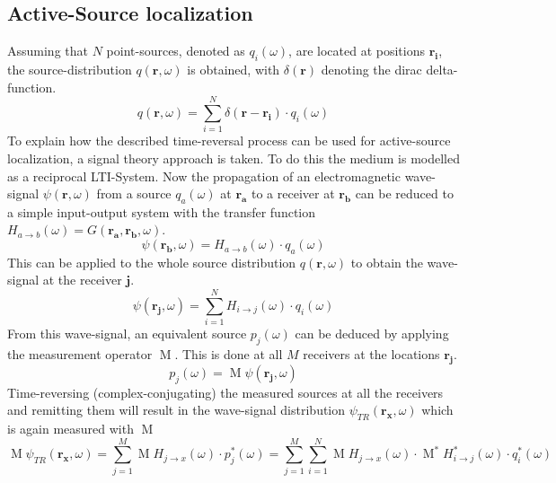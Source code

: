 \subsection{Active-Source localization}
Assuming that \(N\) point-sources, denoted as \(q_i(\omega)\), are located at positions \(\mathbf{r_i}\), the source-distribution \(q(\mathbf{r}, \omega)\) is obtained, with \(\delta(\mathbf{r}) \) denoting the dirac delta-function.
\begin{equation}
    q(\mathbf{r}, \omega) = \sum_{i=1}^{N} \delta(\mathbf{r} - \mathbf{r_i}) \cdot q_i(\omega)
\end{equation}
To explain how the described time-reversal process can be used for active-source localization, a signal theory approach is taken.
To do this the medium is modelled as a reciprocal LTI-System.
Now the propagation of an electromagnetic wave-signal \(\psi(\mathbf{r}, \omega )\) from a source \(q_a(\omega )\) at \(\mathbf{r_a}\) to a receiver at \(\mathbf{r_b}\) can be reduced to a simple input-output system with the transfer function \(H_{a\rightarrow b}(\omega) = G(\mathbf{r_a}, \mathbf{r_b}, \omega)\).
\begin{equation}
    \psi(\mathbf{r_b}, \omega) = H_{a\rightarrow b}(\omega) \cdot q_a(\omega)
\end{equation}
This can be applied to the whole source distribution \(q(\mathbf{r}, \omega)\) to obtain the wave-signal at the receiver \(\mathbf{j}\).
\begin{equation}
    \psi(\mathbf{r_j}, \omega) = \sum_{i=1}^{N} H_{i\rightarrow j}(\omega) \cdot q_i(\omega)
\end{equation}
From this wave-signal, an equivalent source \(p_j(\omega)\) can be deduced by applying the measurement operator \(\operatorname{M}\). This is done at all \(M\) receivers at the locations \(\mathbf{r_j}\).  
\begin{equation}
    p_j(\omega) = \operatorname{M} \psi(\mathbf{r_j}, \omega)
\end{equation}
Time-reversing (complex-conjugating) the measured sources at all the receivers and remitting them will result in the wave-signal distribution \(\psi_{TR}(\mathbf{r_x}, \omega)\) which is again measured with \(\operatorname{M}\)
\begin{equation}\label{signal-time-reversal}
    \operatorname{M} \psi_{TR}(\mathbf{r_x}, \omega) = \sum_{j=1}^{M} \operatorname{M} H_{j\rightarrow x}(\omega ) \cdot p_j^*(\omega) = \sum_{j=1}^{M} \sum_{i=1}^{N} \operatorname{M} H_{j\rightarrow x}(\omega) \cdot \operatorname{M}^* H^*_{i\rightarrow j}(\omega) \cdot q^*_i(\omega)
\end{equation}

